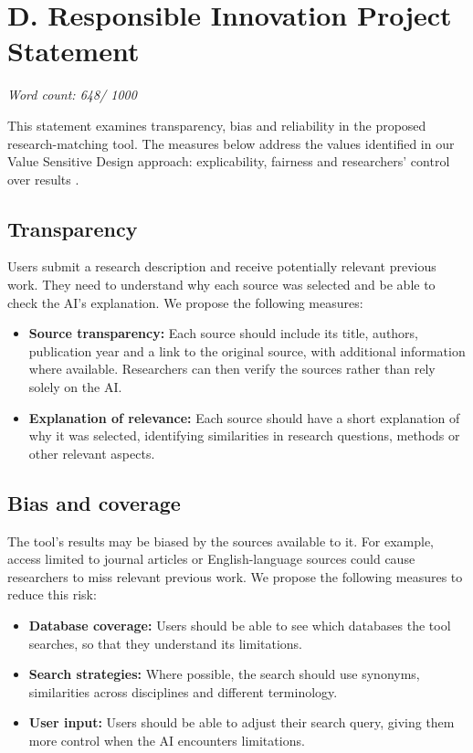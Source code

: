 \documentclass[11pt,a4paper]{article}
\newcommand{\Dwordcount}{648}
\begin{document}
\clearpage
\section*{D. Responsible Innovation Project Statement}
\noindent\textit{Word count: \Dwordcount / 1000}\par\medskip

This statement examines transparency, bias and reliability in the proposed research-matching tool. The measures below address the values identified in our Value Sensitive Design approach: explicability, fairness and researchers' control over results \citep{friedman2008}.

\subsection*{Transparency}
Users submit a research description and receive potentially relevant previous work. They need to understand why each source was selected and be able to check the AI's explanation. We propose the following measures:
\begin{itemize}[leftmargin=*]
    \item \textbf{Source transparency:} Each source should include its title, authors, publication year and a link to the original source, with additional information where available. Researchers can then verify the sources rather than rely solely on the AI.
    \item \textbf{Explanation of relevance:} Each source should have a short explanation of why it was selected, identifying similarities in research questions, methods or other relevant aspects.
\end{itemize}

\subsection*{Bias and coverage}
The tool's results may be biased by the sources available to it. For example, access limited to journal articles or English-language sources could cause researchers to miss relevant previous work. We propose the following measures to reduce this risk:
\begin{itemize}[leftmargin=*]
    \item \textbf{Database coverage:} Users should be able to see which databases the tool searches, so that they understand its limitations.
    \item \textbf{Search strategies:} Where possible, the search should use synonyms, similarities across disciplines and different terminology.
    \item \textbf{User input:} Users should be able to adjust their search query, giving them more control when the AI encounters limitations.
\end{itemize}
\end{document}
